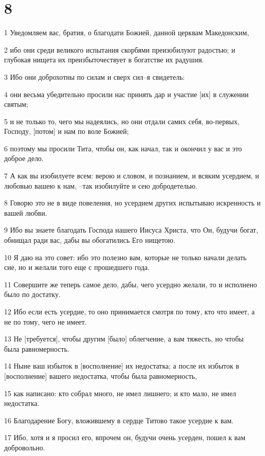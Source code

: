 \chapter{8}

\par 1 Уведомляем вас, братия, о благодати Божией, данной церквам Македонским,
\par 2 ибо они среди великого испытания скорбями преизобилуют радостью; и глубокая нищета их преизбыточествует в богатстве их радушия.
\par 3 Ибо они доброхотны по силам и сверх сил--я свидетель:
\par 4 они весьма убедительно просили нас принять дар и участие [их] в служении святым;
\par 5 и не только то, чего мы надеялись, но они отдали самих себя, во-первых, Господу, [потом] и нам по воле Божией;
\par 6 поэтому мы просили Тита, чтобы он, как начал, так и окончил у вас и это доброе дело.
\par 7 А как вы изобилуете всем: верою и словом, и познанием, и всяким усердием, и любовью вашею к нам, --так изобилуйте и сею добродетелью.
\par 8 Говорю это не в виде повеления, но усердием других испытываю искренность и вашей любви.
\par 9 Ибо вы знаете благодать Господа нашего Иисуса Христа, что Он, будучи богат, обнищал ради вас, дабы вы обогатились Его нищетою.
\par 10 Я даю на это совет: ибо это полезно вам, которые не только начали делать сие, но и желали того еще с прошедшего года.
\par 11 Совершите же теперь самое дело, дабы, чего усердно желали, то и исполнено было по достатку.
\par 12 Ибо если есть усердие, то оно принимается смотря по тому, кто что имеет, а не по тому, чего не имеет.
\par 13 Не [требуется], чтобы другим [было] облегчение, а вам тяжесть, но чтобы была равномерность.
\par 14 Ныне ваш избыток в [восполнение] их недостатка; а после их избыток в [восполнение] вашего недостатка, чтобы была равномерность,
\par 15 как написано: кто собрал много, не имел лишнего; и кто мало, не имел недостатка.
\par 16 Благодарение Богу, вложившему в сердце Титово такое усердие к вам.
\par 17 Ибо, хотя и я просил его, впрочем он, будучи очень усерден, пошел к вам добровольно.
